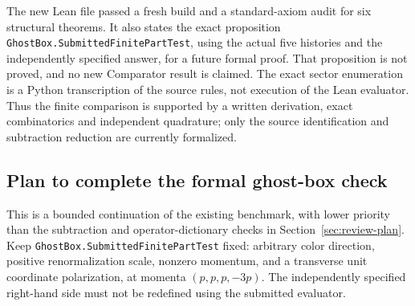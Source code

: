 \documentclass[11pt]{article}
\newcommand{\code}[1]{{\small\nolinkurl{#1}}}
\begin{document}
The new Lean file passed a fresh build and a standard-axiom audit for six
structural theorems. It also states the exact proposition
\code{GhostBox.SubmittedFinitePartTest}, using the actual five histories
and the independently specified answer, for a future formal proof.
That proposition is not proved, and no new Comparator result is claimed.
The exact sector enumeration is a Python transcription of the source
rules, not execution of the Lean evaluator. Thus the finite comparison is
supported by a written derivation, exact combinatorics and independent
quadrature; only the source identification and subtraction reduction are
currently formalized.

\subsection{Plan to complete the formal ghost-box check}
\label{sec:box-plan}

This is a bounded continuation of the existing benchmark, with lower priority
than the subtraction and operator-dictionary checks in
Section~\ref{sec:review-plan}. Keep \code{GhostBox.SubmittedFinitePartTest}
fixed: arbitrary color direction, positive renormalization scale, nonzero
momentum, and a transverse unit coordinate polarization, at momenta
$(p,p,p,-3p)$. The independently specified right-hand side must not be
redefined using the submitted evaluator.
\end{document}
